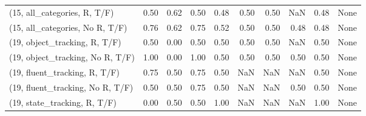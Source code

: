 \begin{table*}[h!]
\begin{adjustbox}{width=2\columnwidth,center}
\begin{tabular}{lrrr|rrr|rrr}
(15, all\_categories, R, T/F)          &                      0.50 &                  0.62 &                      0.50 &                          0.48 &                      0.50 &                          0.50 &                                    NaN &                               0.48 &                                  None \\
(15, all\_categories, No R, T/F)       &                      0.76 &                  0.62 &                      0.75 &                          0.52 &                      0.50 &                          0.50 &                                   0.48 &                               0.48 &                                  None \\



\midrule
(19, object\_tracking, R, T/F)         &                      0.50 &                  0.00 &                      0.50 &                          0.50 &                      0.50 &                          0.50 &                                    NaN &                               0.50 &                                  None \\
(19, object\_tracking, No R, T/F)      &                      1.00 &                  0.00 &                      1.00 &                          0.50 &                      0.50 &                          0.50 &                                   0.50 &                               0.50 &                                  None \\
(19, fluent\_tracking, R, T/F)         &                      0.75 &                  0.50 &                      0.75 &                          0.50 &                       NaN &                           NaN &                                    NaN &                               0.50 &                                  None \\
(19, fluent\_tracking, No R, T/F)      &                      0.50 &                  0.50 &                      0.75 &                          0.50 &                       NaN &                           NaN &                                   0.50 &                               0.50 &                                  None \\
(19, state\_tracking, R, T/F)          &                      0.00 &                  0.50 &                      0.50 &                          1.00 &                       NaN &                           NaN &                                    NaN &                               1.00 &                                  None \\

\end{tabular}
\end{adjustbox}
\end{table*}
